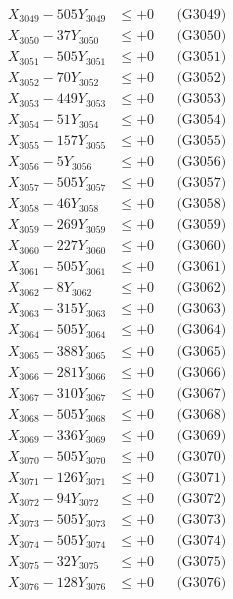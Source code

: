 \documentclass[a4paper,10pt]{article}
\begin{document}
{\begin{align}
X_{3049} - 505Y_{3049} &\leq +0 && \text{(G3049)} \\
X_{3050} - 37Y_{3050} &\leq +0 && \text{(G3050)} \\
\allowbreak
X_{3051} - 505Y_{3051} &\leq +0 && \text{(G3051)} \\
X_{3052} - 70Y_{3052} &\leq +0 && \text{(G3052)} \\
X_{3053} - 449Y_{3053} &\leq +0 && \text{(G3053)} \\
X_{3054} - 51Y_{3054} &\leq +0 && \text{(G3054)} \\
X_{3055} - 157Y_{3055} &\leq +0 && \text{(G3055)} \\
X_{3056} - 5Y_{3056} &\leq +0 && \text{(G3056)} \\
X_{3057} - 505Y_{3057} &\leq +0 && \text{(G3057)} \\
X_{3058} - 46Y_{3058} &\leq +0 && \text{(G3058)} \\
X_{3059} - 269Y_{3059} &\leq +0 && \text{(G3059)} \\
X_{3060} - 227Y_{3060} &\leq +0 && \text{(G3060)} \\
\allowbreak
X_{3061} - 505Y_{3061} &\leq +0 && \text{(G3061)} \\
X_{3062} - 8Y_{3062} &\leq +0 && \text{(G3062)} \\
X_{3063} - 315Y_{3063} &\leq +0 && \text{(G3063)} \\
X_{3064} - 505Y_{3064} &\leq +0 && \text{(G3064)} \\
X_{3065} - 388Y_{3065} &\leq +0 && \text{(G3065)} \\
X_{3066} - 281Y_{3066} &\leq +0 && \text{(G3066)} \\
X_{3067} - 310Y_{3067} &\leq +0 && \text{(G3067)} \\
X_{3068} - 505Y_{3068} &\leq +0 && \text{(G3068)} \\
X_{3069} - 336Y_{3069} &\leq +0 && \text{(G3069)} \\
X_{3070} - 505Y_{3070} &\leq +0 && \text{(G3070)} \\
\allowbreak
X_{3071} - 126Y_{3071} &\leq +0 && \text{(G3071)} \\
X_{3072} - 94Y_{3072} &\leq +0 && \text{(G3072)} \\
X_{3073} - 505Y_{3073} &\leq +0 && \text{(G3073)} \\
X_{3074} - 505Y_{3074} &\leq +0 && \text{(G3074)} \\
X_{3075} - 32Y_{3075} &\leq +0 && \text{(G3075)} \\
X_{3076} - 128Y_{3076} &\leq +0 && \text{(G3076)} \\

\end{align}}
\end{document}
